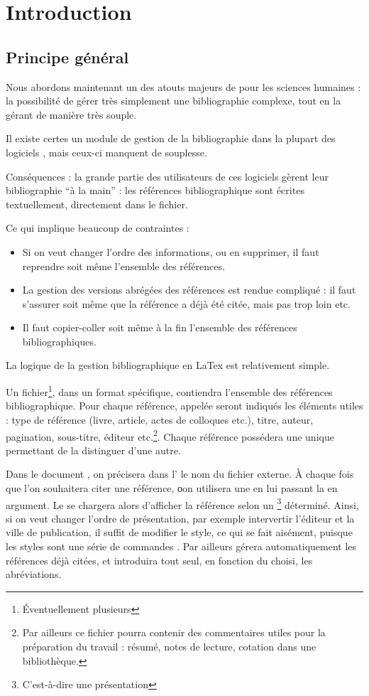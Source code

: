\chapter*{Introduction}
\section{Principe général}

Nous abordons maintenant un des atouts majeurs de \logiciel{\LaTeX} pour les sciences humaines : la possibilité de gérer très simplement une bibliographie complexe, tout en la gérant de manière très souple.

Il existe certes un module de gestion de la bibliographie dans la plupart des logiciels , mais ceux-ci manquent de souplesse.

Conséquences : la grande partie des utilisateurs de ces logiciels gèrent leur bibliographie \enquote{à la main} : les références bibliographique sont écrites textuellement, directement dans le fichier. 

Ce qui implique beaucoup de contraintes  :
\begin{itemize}
\item Si on veut changer l'ordre des informations, ou en supprimer, il faut reprendre soit même l'ensemble des références.
\item La gestion des versions abrégées des références est rendue compliqué :  il faut s'assurer soit même que la référence a déjà été citée, mais pas trop loin etc. 
\item Il faut copier-coller soit même à la fin l'ensemble des références bibliographiques. 
\end{itemize}

La logique de la gestion bibliographique en LaTex est relativement simple.

Un fichier\footnote{Éventuellement plusieurs}, dans un format spécifique, contiendra l'ensemble des références bibliographique. Pour chaque référence, appelée  seront indiqués les éléments utiles :  type de référence (livre, article, actes de colloques etc.), titre, auteur, pagination, sous-titre, éditeur etc.\footnote{Par ailleurs ce fichier pourra contenir des commentaires utiles pour la préparation du travail : résumé, notes de lecture, cotation dans une bibliothèque.
}. Chaque référence possédera une  unique permettant de la distinguer d'une autre.

Dans le document \logiciel{\LaTex}, on précisera dans l' le nom du fichier externe. À chaque fois que l'on souhaitera citer une référence, οon utilisera une  en lui passant la  en argument. Le   se chargera alors d'afficher la référence selon un \footnote{C’est-à-dire une présentation} déterminé. Ainsi, si on veut changer l'ordre de présentation, par exemple intervertir l'éditeur et la ville de publication, il suffit de modifier le style, ce qui se fait aisément, puisque les styles sont une série de commandes \logiciel{\latex}. Par ailleurs  gérera automatiquement les références déjà citées, et introduira tout seul, en fonction du  choisi, les abréviations. 


